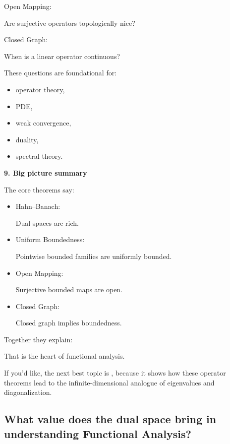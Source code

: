 \documentclass[12pt,a4paper]{report}
\begin{document}
\begin{description}
\begin{description}
        \item Open Mapping:

Are surjective operators topologically nice?

        \item Closed Graph:
	\end{description}

When is a linear operator continuous?

These questions are foundational for:

	\begin{itemize}
    \item operator theory,
    \item PDE,
    \item weak convergence,
    \item duality,
    \item spectral theory.
	\end{itemize}

\item \textbf{9. Big picture summary}

The core theorems say:

	\begin{itemize}
    \item Hahn–Banach:

Dual spaces are rich.

    \item Uniform Boundedness:

Pointwise bounded families are uniformly bounded.

    \item Open Mapping:

Surjective bounded maps are open.

    \item Closed Graph:

Closed graph implies boundedness.
	\end{itemize}

Together they explain:

\> 

That is the heart of functional analysis.
\end{description}

If you'd like, the next best topic is , because it shows how these operator theorems lead to the infinite-dimensional analogue of eigenvalues and diagonalization.

\newpage
\subsection*{What value does the dual space bring in understanding Functional Analysis?}
\end{document}
